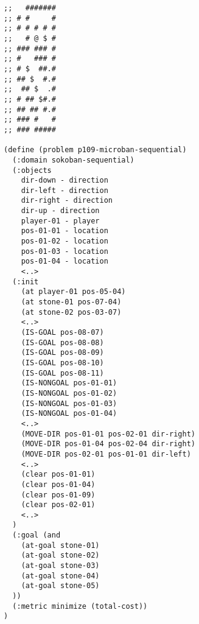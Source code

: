 \linespread{0.80}
\begin{verbatim}
;;   #######
;; # #     #
;; # # # # #
;;   # @ $ #
;; ### ### #
;; #   ### #
;; # $  ##.#
;; ## $  #.#
;;  ## $  .#
;; # ## $#.#
;; ## ## #.#
;; ### #   #
;; ### #####

(define (problem p109-microban-sequential)
  (:domain sokoban-sequential)
  (:objects
    dir-down - direction
    dir-left - direction
    dir-right - direction
    dir-up - direction
    player-01 - player
    pos-01-01 - location
    pos-01-02 - location
    pos-01-03 - location
    pos-01-04 - location    
    <..>
  (:init
    (at player-01 pos-05-04)
    (at stone-01 pos-07-04)
    (at stone-02 pos-03-07)
    <..>
    (IS-GOAL pos-08-07)
    (IS-GOAL pos-08-08)
    (IS-GOAL pos-08-09)
    (IS-GOAL pos-08-10)
    (IS-GOAL pos-08-11)
    (IS-NONGOAL pos-01-01)
    (IS-NONGOAL pos-01-02)
    (IS-NONGOAL pos-01-03)
    (IS-NONGOAL pos-01-04)
    <..>
    (MOVE-DIR pos-01-01 pos-02-01 dir-right)
    (MOVE-DIR pos-01-04 pos-02-04 dir-right)
    (MOVE-DIR pos-02-01 pos-01-01 dir-left)
    <..>
    (clear pos-01-01)
    (clear pos-01-04)
    (clear pos-01-09)
    (clear pos-02-01)
    <..>
  )
  (:goal (and
    (at-goal stone-01)
    (at-goal stone-02)
    (at-goal stone-03)
    (at-goal stone-04)
    (at-goal stone-05)
  ))
  (:metric minimize (total-cost))
)    
    
\end{verbatim}
\linespread{1.25}